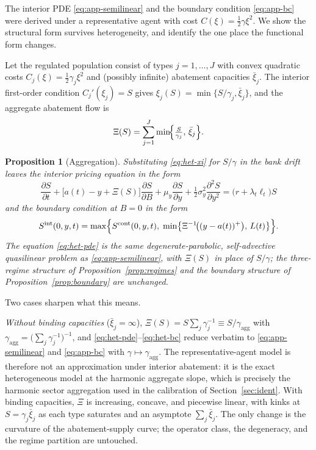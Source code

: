 \documentclass[11pt,letterpaper]{article}
\theoremstyle{plain}
\newtheorem{proposition}[theorem]{Proposition}
\theoremstyle{definition}
\numberwithin{equation}{section}
\begin{document}
The interior PDE \eqref{eq:app-semilinear} and the boundary condition \eqref{eq:app-bc} were derived under a representative agent with cost $C(\xi)=\tfrac12\gamma\xi^2$. We show the structural form survives heterogeneity, and identify the one place the functional form changes.

Let the regulated population consist of types $j=1,\dots,J$ with convex quadratic costs $C_j(\xi)=\tfrac12\gamma_j\xi^2$ and (possibly infinite) abatement capacities $\bar\xi_j$. The interior first-order condition $C_j'(\xi_j)=S$ gives $\xi_j(S)=\min\{S/\gamma_j,\bar\xi_j\}$, and the aggregate abatement flow is
\begin{equation}\label{eq:het-xi}
  \Xi(S)=\sum_{j=1}^{J}\min\!\Bigl\{\tfrac{S}{\gamma_j},\,\bar\xi_j\Bigr\}.
\end{equation}

\begin{proposition}[Aggregation]\label{prop:hetmac}
Substituting \eqref{eq:het-xi} for $S/\gamma$ in the bank drift leaves the interior pricing equation in the form
\begin{equation}\label{eq:het-pde}
  \frac{\partial S}{\partial t}+\bigl[a(t)-y+\Xi(S)\bigr]\frac{\partial S}{\partial B}
  +\mu_y\frac{\partial S}{\partial y}+\tfrac12\sigma_y^2\frac{\partial^2 S}{\partial y^2}=\bigl(r+\lambda_t\ell_t\bigr)S
\end{equation}
and the boundary condition at $B=0$ in the form
\begin{equation}\label{eq:het-bc}
  S^{\mathrm{int}}(0,y,t)=\max\Bigl\{S^{\mathrm{cont}}(0,y,t),\;
  \min\bigl\{\Xi^{-1}\!\bigl((y-a(t))^{+}\bigr),\,L(t)\bigr\}\Bigr\}.
\end{equation}
The equation \eqref{eq:het-pde} is the same degenerate-parabolic, self-advective quasilinear problem as \eqref{eq:app-semilinear}, with $\Xi(S)$ in place of $S/\gamma$; the three-regime structure of Proposition~\ref{prop:regimes} and the boundary structure of Proposition~\ref{prop:boundary} are unchanged.
\end{proposition}

Two cases sharpen what this means. 

\emph{Without binding capacities} ($\bar\xi_j=\infty$),  $\Xi(S)=S\sum_j\gamma_j^{-1}\equiv S/\gamma_{\mathrm{agg}}$ with $\gamma_{\mathrm{agg}}=\bigl(\sum_j\gamma_j^{-1}\bigr)^{-1}$, and \eqref{eq:het-pde}--\eqref{eq:het-bc} reduce verbatim to \eqref{eq:app-semilinear} and \eqref{eq:app-bc} with $\gamma\!\mapsto\!\gamma_{\mathrm{agg}}$. The representative-agent model is therefore not an approximation under interior abatement: it is the exact heterogeneous model at the harmonic aggregate slope, which is precisely the harmonic sector aggregation used in the calibration of Section~\ref{sec:ident}. With binding capacities, $\Xi$ is increasing, concave, and piecewise linear, with kinks at $S=\gamma_j\bar\xi_j$ as each type saturates and an asymptote $\sum_j\bar\xi_j$. The only change is the curvature of the abatement-supply curve; the operator class, the degeneracy, and the regime partition are untouched.
\end{document}
